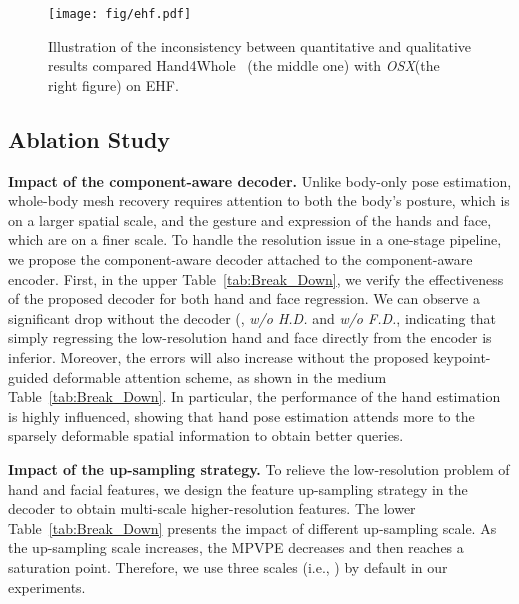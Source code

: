 \documentclass[10pt,twocolumn,letterpaper]{article}
\newcommand{\modelname}{\emph{OSX}\xspace}
\begin{document}
\begin{figure}[t]
\vspace{-0.2cm}
\begin{center}
\texttt{[image: fig/ehf.pdf]}
\end{center}
\vspace{-0.4cm}
\caption{
Illustration of the inconsistency between quantitative and qualitative results compared Hand4Whole~\cite{GyeongsikMoon2020hand4whole} (the middle one) with \modelname (the right figure) on EHF.
}
\vspace{-0.6cm}
\label{fig:vis_ehf}
\end{figure}
 
\subsection{Ablation Study}
\vspace{-0.1cm}
\noindent \textbf{Impact of the component-aware decoder.}
Unlike body-only pose estimation, whole-body mesh recovery requires attention to both the body's posture, which is on a larger spatial scale, and the gesture and expression of the hands and face, which are on a finer scale. To handle the resolution issue in a one-stage pipeline, we propose the component-aware decoder attached to the component-aware encoder.
First, in the upper Table~\ref{tab:Break_Down}, we verify the effectiveness of the proposed decoder for both hand and face regression. We can observe a significant drop without the decoder (\eg, \emph{w/o H.D.} and \emph{w/o F.D.}, indicating that simply regressing the low-resolution hand and face directly from the encoder is inferior. 
Moreover, the errors will also increase without the proposed keypoint-guided deformable attention scheme, as shown in the medium Table~\ref{tab:Break_Down}. In particular, the performance of the hand estimation is highly influenced, showing that hand pose estimation attends more to the sparsely deformable spatial information to obtain better queries.

\noindent \textbf{Impact of the up-sampling strategy.}
To relieve the low-resolution problem of hand and facial features, we design the feature up-sampling strategy in the decoder to obtain multi-scale higher-resolution features. 
The lower Table~\ref{tab:Break_Down} presents the impact of different up-sampling  scale. 
As the up-sampling scale increases, the MPVPE decreases and then reaches a saturation point. Therefore, we use three scales (i.e., ) by default in our experiments.
\end{document}
